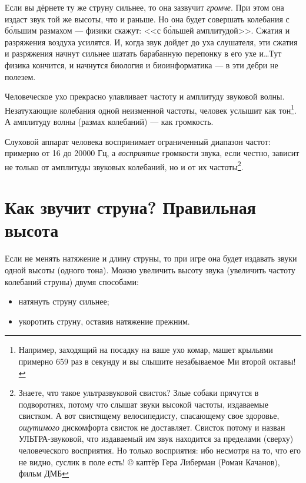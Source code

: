 Если вы дёрнете ту же струну сильнее, то она зазвучит \emph{громче}. При этом она издаст звук той же высоты, что и раньше. Но она будет совершать колебания с б\'{о}льшим размахом --- физики скажут: <<с б\'{о}льшей амплитудой>>. Сжатия и разряжения воздуха усилятся. И, когда звук дойдет до уха слушателя, эти сжатия и разряжения начнут сильнее шатать барабанную перепонку в его ухе и\ldots Тут физика кончится, и начнутся биология и биоинформатика --- в эти дебри не полезем.

Человеческое ухо прекрасно улавливает частоту и амплитуду звуковой волны. Незатухающие колебания одной неизменной частоты, человек услышит как тон\footnote{Например, заходящий на посадку на ваше ухо комар, машет крыльями примерно 659 раз в секунду и вы слышите незабываемое Ми второй октавы!}. А амплитуду волны (размах колебаний) --- как громкость. 

Слуховой аппарат человека воспринимает ограниченный диапазон частот: примерно от 16 до 20000 Гц, а \emph{восприятие} громкости звука, если честно, зависит не только от амплитуды звуковых колебаний, но и от их частоты\footnote{Знаете, что такое ультразвуковой свисток? Злые собаки прячутся в подворотнях, потому что слышат звуки высокой частоты, издаваемые свистком. А вот свистящему велосипедисту, спасающему свое здоровье, \emph{ощутимого} дискомфорта свисток не доставляет.  Свисток потому и назван УЛЬТРА-звуковой, что издаваемый им звук находится за пределами (сверху) человеческого восприятия. Но только восприятия: ибо несмотря на то, что его не видно, суслик в поле есть! {\copyright} каптёр Гера Либерман (Роман Качанов), фильм ДМБ}. 


\section{Как звучит струна? Правильная высота}
\label{ch:music:tone}

Если не менять натяжение и длину струны, то при игре она будет издавать звуки одной высоты (одного тона). Можно увеличить высоту звука (увеличить частоту колебаний струны) двумя способами:
\begin{itemize}
    \item натянуть струну сильнее;
    \item укоротить струну, оставив натяжение прежним.
\end{itemize}

